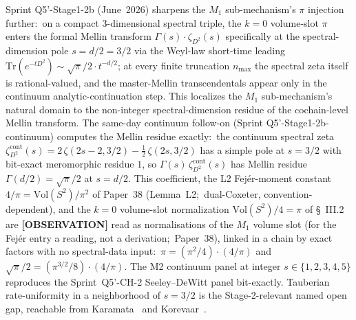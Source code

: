 \documentclass[aps,pra,twocolumn,superscriptaddress,longbibliography]{revtex4-2}
\begin{document}
Sprint Q5'-Stage1-2b (June~2026) sharpens the
$M_1$ sub-mechanism's $\pi$ injection further:\ on a compact
3-dimensional spectral triple, the $k = 0$ volume-slot $\pi$ enters
the formal Mellin transform $\Gamma(s) \cdot \zeta_{D^2}(s)$
specifically at the spectral-dimension pole $s = d/2 = 3/2$ via the
Weyl-law short-time leading
$\mathrm{Tr}(e^{-tD^2}) \sim \sqrt{\pi}/2 \cdot t^{-d/2}$;
at every finite truncation $n_{\max}$ the spectral zeta itself is
rational-valued, and the master-Mellin transcendentals appear only
in the continuum analytic-continuation step.  This localizes the
$M_1$ sub-mechanism's natural domain to the non-integer
spectral-dimension residue of the cochain-level Mellin transform.
The same-day continuum follow-on (Sprint Q5'-Stage1-2b-continuum) computes the
Mellin residue exactly:\ the continuum spectral zeta
$\zeta_{D^2}^{\mathrm{cont}}(s) = 2\,\zeta(2s - 2, 3/2) - \tfrac{1}{2}\,\zeta(2s, 3/2)$
has a simple pole at $s = 3/2$ with bit-exact meromorphic residue $1$,
so $\Gamma(s)\,\zeta_{D^2}^{\mathrm{cont}}(s)$ has Mellin residue
$\Gamma(d/2) = \sqrt{\pi}/2$ at $s = d/2$.  This coefficient, the
L2 Fej\'er-moment constant
$4/\pi = \mathrm{Vol}(S^2)/\pi^2$ of Paper~38 (Lemma~L2;\ dual-Coxeter,
convention-dependent), and the $k = 0$ volume-slot normalization
$\mathrm{Vol}(S^2)/4 = \pi$ of \S~III.2 are \textbf{[OBSERVATION]}
read as normalisations of the $M_1$ volume slot (for the Fej\'er entry a
reading, not a derivation;\ Paper~38),
linked in a chain by exact factors with no spectral-data input:\
$\pi = (\pi^2/4)\cdot(4/\pi)$ and
$\sqrt{\pi}/2 = (\pi^{3/2}/8)\cdot(4/\pi)$.  The M2 continuum panel at integer
$s \in \{1, 2, 3, 4, 5\}$ reproduces the Sprint~Q5'-CH-2
Seeley--DeWitt panel bit-exactly.  Tauberian rate-uniformity in a
neighborhood of $s = 3/2$ is the Stage-2-relevant named open gap,
reachable from Karamata~\cite{karamata1962} and
Korevaar~\cite{korevaar2004}.
\end{document}
